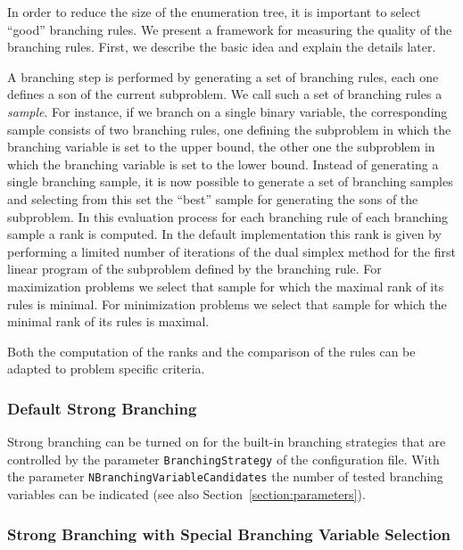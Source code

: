 In order to reduce the size of the enumeration tree, it is important
to select ``good'' branching rules. We present a framework for
measuring the quality of the branching rules. First, we describe the
basic idea and explain the details later.

A branching step is performed by generating a set of branching rules,
each one defines a son of the current subproblem. We call such a set of
branching rules a {\it sample\/}. For instance, if we branch on a single binary variable, the
corresponding sample consists of two branching rules, one defining the
subproblem in which the branching variable is set to the upper bound,
the other one the subproblem in which the branching variable is set to
the lower bound. Instead of generating a single branching sample, it
is now possible to generate a set of branching samples and selecting
from this set the ``best'' sample for generating the sons of the
subproblem. In this evaluation process for each branching rule of
each branching sample a rank is computed. In the default
implementation this rank is given by performing a limited number of
iterations of the dual simplex method for the first linear program
of the subproblem defined by the branching rule. For maximization
problems we select that sample for which the maximal rank of
its rules is minimal. For minimization problems we select that sample
for which the minimal rank of its rules is maximal.

Both the computation of the ranks and the comparison of the rules can
be adapted to problem specific criteria.

\subsubsection{Default Strong Branching}

Strong branching can be turned on for the built-in branching
strategies that are controlled by the parameter 
{\tt BranchingStrategy} of the
configuration file. With the parameter 
{\tt NBranchingVariableCandidates} 
the number of tested branching variables can be indicated 
(see also Section~\ref{section:parameters}).

\subsubsection{Strong Branching with Special Branching Variable Selection}

